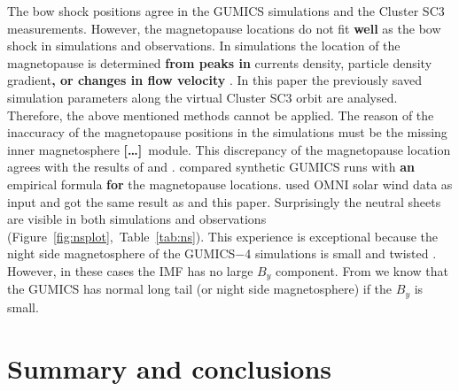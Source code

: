 \documentclass[linenumbers,draft]{agujournal}
\newcommand{\del}{\textbf{[\dots]}\ } %
\begin{document}
The bow shock positions agree in the GUMICS simulations and the Cluster SC3 measurements. However, the magnetopause locations do not fit \textbf{well} as the bow shock in simulations and observations. In simulations the location of the magnetopause is determined \textbf{from peaks in} currents density, particle density gradient\textbf{, or changes in flow velocity} \citep[][see references therein]{siscoe01:_magnet_fluop,garcia07:_findin_lyon_fedder_mobar,gordeev13:_verif_gumic_mhd}. In this paper the previously saved simulation parameters along the virtual Cluster SC3 orbit are analysed. Therefore, the above mentioned methods cannot be applied. The reason of the inaccuracy of the magnetopause positions in the simulations must be the missing inner magnetosphere \del module. This discrepancy of the magnetopause location agrees with the results of \citet{gordeev13:_verif_gumic_mhd} and \citet{facsko16:_one_earth}. \citet{gordeev13:_verif_gumic_mhd} compared synthetic GUMICS runs with \textbf{an} empirical formula \textbf{for} the magnetopause locations. \citet{facsko16:_one_earth} used OMNI solar wind data as input and got the same result as \citet{gordeev13:_verif_gumic_mhd} and this paper. Surprisingly the neutral sheets are visible in both simulations and observations (Figure~\ref{fig:nsplot},~Table~\ref{tab:ns}). This experience is exceptional because the night side magnetosphere of the GUMICS$-$4 simulations is small and twisted \citep{gordeev13:_verif_gumic_mhd,facsko16:_one_earth}. However, in these cases the IMF has no large $B_{y}$ component. From \citet{facsko16:_one_earth} we know that the GUMICS has normal long tail (or night side magnetosphere) if the $B_{y}$ is small.

\section{Summary and conclusions}
\label{sec:concl}
\end{document}
